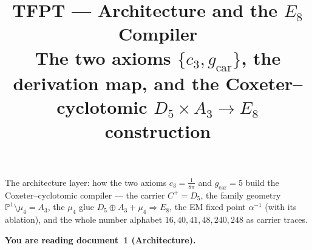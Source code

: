 \documentclass[11pt,a4paper]{article}
\title{\vspace{-1.2cm}\textbf{TFPT --- Architecture and the $E_8$ Compiler}\\[2mm]\large The two axioms $\{c_3,g_{\mathrm{car}}\}$, the derivation map, and the Coxeter--cyclotomic $D_5\times A_3\to E_8$ construction}
\author{\TFPTauthors}\date{\TFPTdatestamp}
\theoremstyle{definition}
\begin{document}
\maketitle
\vspace{-0.4cm}

\begin{keybox}
The architecture layer: how the two axioms $c_3=\tfrac1{8\pi}$ and $g_{\mathrm{car}}=5$ build the
Coxeter--cyclotomic compiler --- the carrier $C^+{=}D_5$, the family geometry $\mathbb P^1\setminus\mu_4{=}A_3$,
the $\mu_4$ glue $D_5\oplus A_3+\mu_4\Rightarrow E_8$, the EM fixed point $\alpha^{-1}$ (with its ablation),
and the whole number alphabet $16,40,41,48,240,248$ as carrier traces.
\end{keybox}


\noindent\textbf{You are reading \textbf{document~1} (Architecture).}


\TFPTbadges
\TFPTclaimstack[compiler]


\tableofcontents
\clearpage
\end{document}
